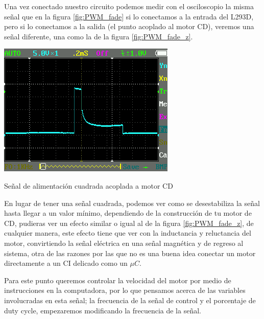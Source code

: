 		Una vez conectado nuestro circuito podemos medir con el osciloscopio la misma señal que en la figura \ref{fig:PWM_fade} si lo conectamos a la entrada del L293D, pero si lo conectamos a la salida (el punto acoplado al motor CD), veremos una señal diferente, una como la de la figura \ref{fig:PWM_fade_z}.

		\begin{marginfigure}
			\begin{center}
				\includegraphics[width=\textwidth]{images/PWM_fade_z.png}
				\caption{Señal de alimentación cuadrada acoplada a motor CD}
				\label{fig:PWM_fade_z}
			\end{center}
		\end{marginfigure}

		En lugar de tener una señal cuadrada, podemos ver como se desestabiliza la señal hasta llegar a un valor mínimo, dependiendo de la construcción de tu motor de CD, pudieras ver un efecto similar o igual al de la figura \ref{fig:PWM_fade_z}, de cualquier manera, este efecto tiene que ver con la inductancia y reluctancia del motor, convirtiendo la señal eléctrica en una señal magnética y de regreso al sistema, otra de las razones por las que no es una buena idea conectar un motor directamente a un CI delicado como un $\mu C$.

		Para este punto queremos controlar la velocidad del motor por medio de instrucciones en la computadora, por lo que pensamos acerca de las variables involucradas en esta señal; la frecuencia de la señal de control y el porcentaje de duty cycle, empezaremos modificando la frecuencia de la señal.

